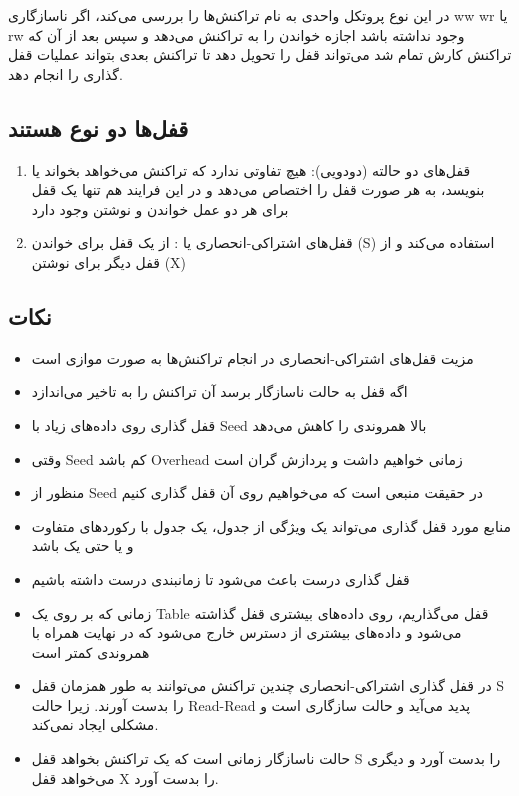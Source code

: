 \documentclass[a4paper]{article}
\begin{document}
در این نوع پروتکل واحدی به نام  تراکنش‌ها را بررسی می‌کند، اگر
ناسازگاری ww wr یا rw وجود نداشته باشد اجازه خواندن را به تراکنش می‌دهد و سپس
بعد از آن که تراکنش کارش تمام شد می‌تواند قفل را تحویل دهد تا تراکنش بعدی بتواند
عملیات قفل گذاری را انجام دهد.

\subsection*{قفل‌ها دو نوع هستند}

\begin{enumerate}
    \item قفل‌های دو حالته (دودویی): هیچ تفاوتی ندارد که تراکنش می‌خواهد بخواند
    یا بنویسد، به هر صورت قفل را اختصاص می‌دهد و در این فرایند هم تنها یک قفل
    برای هر دو عمل خواندن و نوشتن وجود دارد
    \item قفل‌های اشتراکی-انحصاری یا : از یک قفل برای
    خواندن (S) استفاده می‌کند و از قفل دیگر برای نوشتن (X)
\end{enumerate}

\subsection*{نکات}

\begin{itemize}
    \item مزیت قفل‌های اشتراکی-انحصاری در انجام تراکنش‌ها به صورت موازی است
    \item اگه قفل به حالت ناسازگار برسد آن تراکنش را به تاخیر می‌اندازد
    \item قفل گذاری روی داده‌های زیاد با Seed بالا همروندی را کاهش می‌دهد
    \item وقتی Seed کم باشد Overhead زمانی خواهیم داشت و پردازش گران است
    \item منظور از Seed در حقیقت منبعی است که می‌خواهیم روی آن قفل گذاری کنیم
    \item منابع مورد قفل گذاری می‌تواند یک ویژگی از جدول، یک جدول با رکورد‌های
    متفاوت و یا حتی یک  باشد
    \item قفل گذاری درست باعث می‌شود تا زمانبندی درست داشته باشیم
    \item زمانی که بر روی یک Table قفل می‌گذاریم، روی داده‌های بیشتری قفل گذاشته
    می‌شود و داده‌های بیشتری از دسترس خارج می‌شود که در نهایت همراه با همروندی
    کمتر است
    \item در قفل گذاری اشتراکی-انحصاری چندین تراکنش می‌توانند به طور همزمان قفل
    S را بدست آورند. زیرا حالت Read-Read پدید می‌آید  و حالت سازگاری است و مشکلی
    ایجاد نمی‌کند.
    \item حالت ناسازگار زمانی است که یک تراکنش بخواهد قفل S را بدست آورد و دیگری
    می‌خواهد قفل X را بدست آورد.
\end{itemize}
\end{document}
